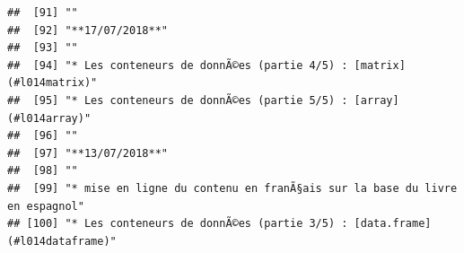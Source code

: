 \documentclass[]{book}
\begin{document}
\begin{verbatim}
##  [91] ""                                                                                                                                                                                                                                                                                                           
##  [92] "**17/07/2018**"                                                                                                                                                                                                                                                                                             
##  [93] ""                                                                                                                                                                                                                                                                                                           
##  [94] "* Les conteneurs de donnÃ©es (partie 4/5) : [matrix](#l014matrix)"                                                                                                                                                                                                                                          
##  [95] "* Les conteneurs de donnÃ©es (partie 5/5) : [array](#l014array)"                                                                                                                                                                                                                                            
##  [96] ""                                                                                                                                                                                                                                                                                                           
##  [97] "**13/07/2018**"                                                                                                                                                                                                                                                                                             
##  [98] ""                                                                                                                                                                                                                                                                                                           
##  [99] "* mise en ligne du contenu en franÃ§ais sur la base du livre en espagnol"                                                                                                                                                                                                                                   
## [100] "* Les conteneurs de donnÃ©es (partie 3/5) : [data.frame](#l014dataframe)"
\end{verbatim}
\end{document}
